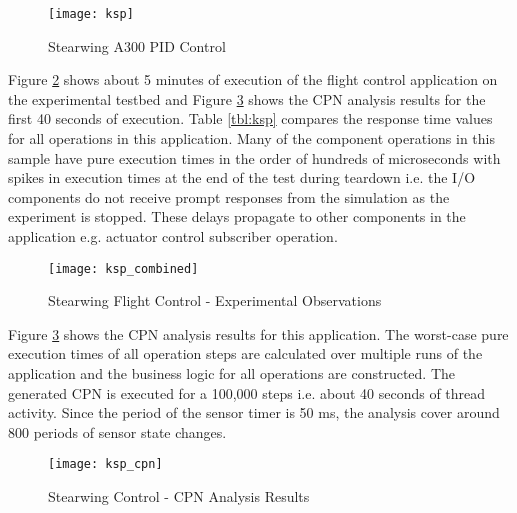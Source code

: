 \begin{figure}[h]
	\centering
	\texttt{[image: ksp]}
	\caption{Stearwing A300 PID Control}
	\label{fig:ksp}
\end{figure} 
\FloatBarrier 

Figure \ref{fig:ksp_combined} shows about 5 minutes of execution of the flight control application on the experimental testbed and Figure \ref{fig:ksp_cpn} shows the CPN analysis results for the first 40 seconds of execution. Table \ref{tbl:ksp} compares the response time values for all operations in this application. Many of the component operations in this sample have pure execution times in the order of hundreds of microseconds with spikes in execution times at the end of the test during teardown i.e. the I/O components do not receive prompt responses from the simulation as the experiment is stopped. These delays propagate to other components in the application e.g. actuator control subscriber operation. 

\begin{figure}[h]
	\centering
	\texttt{[image: ksp\_combined]}
	\caption{Stearwing Flight Control - Experimental Observations}
	\label{fig:ksp_combined}
\end{figure} 
\FloatBarrier 

Figure \ref{fig:ksp_cpn} shows the CPN analysis results for this application. The worst-case pure execution times of all operation steps are calculated over multiple runs of the application and the business logic for all operations are constructed. The generated CPN is executed for a 100,000 steps i.e. about 40 seconds of thread activity. Since the period of the sensor timer is 50 ms, the analysis cover around 800 periods of sensor state changes. 

\begin{figure}[h]
	\centering
	\texttt{[image: ksp\_cpn]}
	\caption{Stearwing Control - CPN Analysis Results}
	\label{fig:ksp_cpn}
\end{figure} 
\FloatBarrier 

